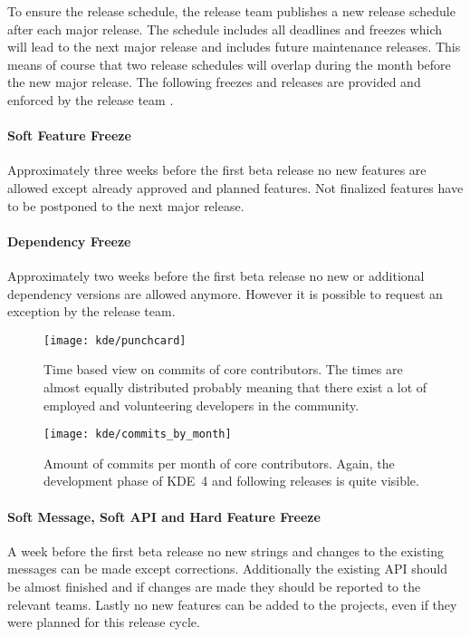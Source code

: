 To ensure the release schedule, the release team publishes a new release
schedule after each major release. The schedule includes all deadlines and
freezes which will lead to the next major release and includes future
maintenance releases. This means of course that two release schedules will
overlap during the month before the new major release. The following freezes
and releases are provided and enforced by the release team
\cite{KDEReleaseSchedule}.

\paragraph{Soft Feature Freeze}

Approximately three weeks before the first beta release no new features are
allowed except already approved and planned features. Not finalized features
have to be postponed to the next major release.

\paragraph{Dependency Freeze}

Approximately two weeks before the first beta release no new or additional
dependency versions are allowed anymore. However it is possible to request an
exception by the release team.

\begin{figure}[bhtp]
  \centering
  \texttt{[image: kde/punchcard]}
  \caption[Time Based View on Commits, KDE]
  {Time based view on commits of core contributors. The times are almost
    equally distributed probably meaning that there exist a lot of employed and
    volunteering developers in the community.}
  \label{fig:kde:p}
\end{figure}

\begin{figure}[thbp]
  \centering
  \texttt{[image: kde/commits\_by\_month]}
  \caption[Commits by Month, KDE]
  {Amount of commits per month of core contributors. Again, the development
    phase of KDE~4 and following releases is quite visible.}
  \label{fig:kde:cbm}
\end{figure}

\paragraph{Soft Message, Soft API and Hard Feature Freeze}

A week before the first beta release no new strings and changes to the
existing messages can be made except corrections. Additionally the existing
\ac{API} should be almost finished and if changes are made they should be
reported to the relevant teams. Lastly no new features can be added to the
projects, even if they were planned for this release cycle.

